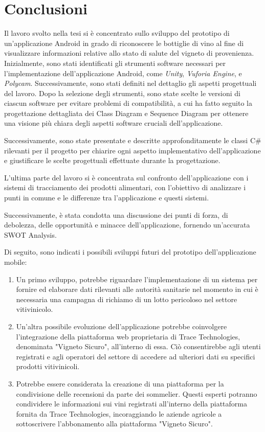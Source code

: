 {}
\chapter*{Conclusioni}

Il lavoro svolto nella tesi si è concentrato sullo sviluppo del prototipo di un'applicazione Android in grado di riconoscere le bottiglie di vino al fine di visualizzare informazioni relative allo stato di salute del vigneto di provenienza. Inizialmente, sono stati identificati gli strumenti software necessari per l'implementazione dell'applicazione Android, come \textit{Unity}, \textit{Vuforia Engine}, e \textit{Polycam}. Successivamente, sono stati definiti nel dettaglio gli aspetti progettuali del lavoro. Dopo la selezione degli strumenti, sono state scelte le versioni di ciascun software per evitare problemi di compatibilità, a cui ha fatto seguito la progettazione dettagliata dei Class Diagram e Sequence Diagram per ottenere una visione più chiara degli aspetti software cruciali dell'applicazione.

Successivamente, sono state presentate e descritte approfonditamente le classi C\# rilevanti per il progetto per chiarire ogni aspetto implementativo dell'applicazione e giustificare le scelte progettuali effettuate durante la progettazione.

L'ultima parte del lavoro si è concentrata sul confronto dell'applicazione con i sistemi di tracciamento dei prodotti alimentari, con l'obiettivo di analizzare i punti in comune e le differenze tra l'applicazione e questi sistemi.

Successivamente, è stata condotta una discussione dei punti di forza, di debolezza, delle opportunità e minacce dell'applicazione, fornendo un'accurata SWOT Analysis. 

Di seguito, sono indicati i possibili sviluppi futuri del prototipo dell'applicazione mobile:

\begin{enumerate}
	\item Un primo sviluppo, potrebbe riguardare l'implementazione di un sistema per fornire ed elaborare dati rilevanti alle autorità sanitarie nel momento in cui è necessaria una campagna di richiamo di un lotto pericoloso nel settore vitivinicolo.
	\item Un'altra possibile evoluzione dell'applicazione potrebbe coinvolgere l'integrazione della piattaforma web proprietaria di Trace Technologies, denominata "Vigneto Sicuro", all'interno di essa. Ciò consentirebbe agli utenti registrati e agli operatori del settore di accedere ad ulteriori dati su specifici prodotti vitivinicoli.
	\item Potrebbe essere considerata la creazione di una piattaforma per la condivisione delle recensioni da parte dei sommelier. Questi esperti potranno condividere le informazioni sui vini registrati all'interno della piattaforma fornita da Trace Technologies, incoraggiando le aziende agricole a sottoscrivere l'abbonamento alla piattaforma "Vigneto Sicuro".
\end{enumerate}
